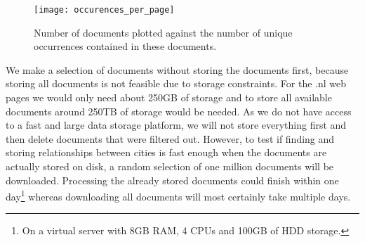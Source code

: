 \begin{figure}[H]
    \centering
    \texttt{[image: occurences\_per\_page]}
    \caption{Number of documents plotted against the number of unique occurrences contained in these documents.}
    \label{fig:occ_per_page}
\end{figure}

We make a selection of documents without storing the documents first, because storing all documents is not feasible due to storage constraints. For the .nl web pages we would only need about 250GB of storage and to store all available documents around 250TB of storage would be needed. As we do not have access to a fast and large data storage platform, we will not store everything first and then delete documents that were filtered out. However, to test if finding and storing relationships between cities is fast enough when the documents are actually stored on disk, a random selection of one million documents will be downloaded. Processing the already stored documents could finish within one day\footnote{On a virtual server with 8GB RAM, 4 CPUs and 100GB of HDD storage.} whereas downloading all documents will most certainly take multiple days.




